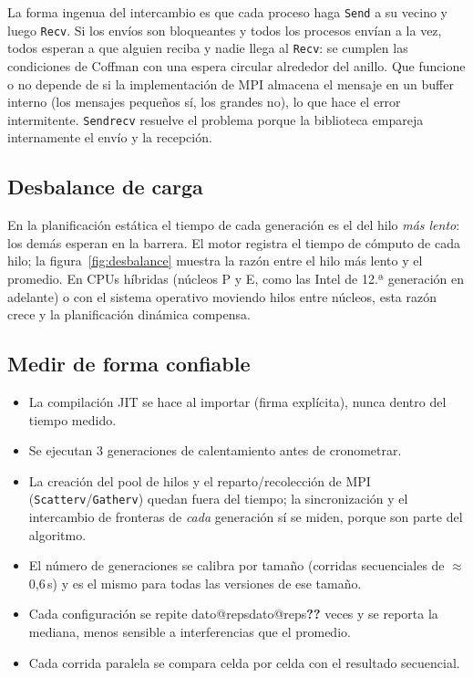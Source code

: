 \documentclass[11pt,a4paper]{article}
\makeatletter
\newcommand{\dato}[1]{\ifcsname dato@#1\endcsname\csname dato@#1\endcsname\else\textbf{\color{red}??}\fi}
\newcommand{\code}[1]{\texttt{#1}}
\makeatother
\begin{document}
La forma ingenua del intercambio es que cada proceso haga \code{Send} a su vecino y luego \code{Recv}. Si los envíos
son bloqueantes y todos los procesos envían a la vez, todos esperan a que alguien reciba y nadie llega
al \code{Recv}: se cumplen las condiciones de Coffman \cite{ostep} con una espera circular alrededor del anillo.
Que funcione o no depende de si la implementación de MPI almacena el mensaje en un buffer interno (los mensajes
pequeños sí, los grandes no), lo que hace el error intermitente. \code{Sendrecv} resuelve el problema porque
la biblioteca empareja internamente el envío y la recepción.

\subsection{Desbalance de carga}

En la planificación estática el tiempo de cada generación es el del hilo \emph{más lento}: los demás esperan en
la barrera. El motor registra el tiempo de cómputo de cada hilo; la figura~\ref{fig:desbalance} muestra la razón
entre el hilo más lento y el promedio. En CPUs híbridas (núcleos P y E, como las Intel de 12.ª generación en
adelante) o con el sistema operativo moviendo hilos entre núcleos, esta razón crece y la planificación dinámica
compensa.

\subsection{Medir de forma confiable}

\begin{itemize}
  \item La compilación JIT se hace al importar (firma explícita), nunca dentro del tiempo medido.
  \item Se ejecutan 3 generaciones de calentamiento antes de cronometrar.
  \item La creación del pool de hilos y el reparto/recolección de MPI (\code{Scatterv}/\code{Gatherv}) quedan fuera
        del tiempo; la sincronización y el intercambio de fronteras de \emph{cada} generación sí se miden, porque son
        parte del algoritmo.
  \item El número de generaciones se calibra por tamaño (corridas secuenciales de $\approx$0,6\,s) y es el mismo para
        todas las versiones de ese tamaño.
  \item Cada configuración se repite \dato{reps} veces y se reporta la mediana, menos sensible a interferencias que el promedio.
  \item Cada corrida paralela se compara celda por celda con el resultado secuencial.
\end{itemize}
\end{document}
